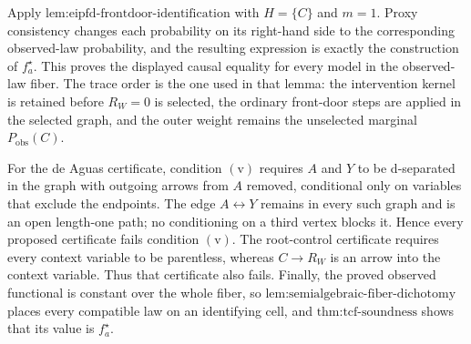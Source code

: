 Apply \(\text{lem:eipfd-frontdoor-identification}\) with \(H=\{C\}\) and \(m=1\). Proxy consistency changes each probability on its right-hand side to the corresponding observed-law probability, and the resulting expression is exactly the construction of \(f_a^\star\). This proves the displayed causal equality for every model in the observed-law fiber. The trace order is the one used in that lemma: the intervention kernel is retained before \(R_W=0\) is selected, the ordinary front-door steps are applied in the selected graph, and the outer weight remains the unselected marginal \(P_{\mathrm{obs}}(C)\).

For the de Aguas certificate, condition \(\mathrm{(v)}\) requires \(A\) and \(Y\) to be d-separated in the graph with outgoing arrows from \(A\) removed, conditional only on variables that exclude the endpoints. The edge \(A\leftrightarrow Y\) remains in every such graph and is an open length-one path; no conditioning on a third vertex blocks it. Hence every proposed certificate fails condition \(\mathrm{(v)}\). The root-control certificate requires every context variable to be parentless, whereas \(C\to R_W\) is an arrow into the context variable. Thus that certificate also fails. Finally, the proved observed functional is constant over the whole fiber, so \(\text{lem:semialgebraic-fiber-dichotomy}\) places every compatible law on an identifying cell, and \(\text{thm:tcf-soundness}\) shows that its value is \(f_a^\star\).